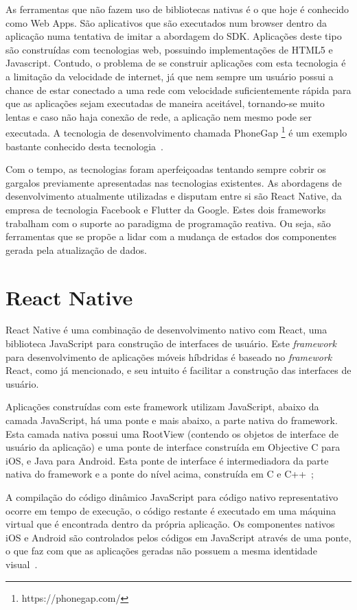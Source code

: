 As ferramentas que não fazem uso de bibliotecas nativas é o que hoje é conhecido como Web Apps.
São aplicativos que são executados num browser dentro da aplicação numa tentativa de imitar a abordagem do SDK. Aplicações deste tipo são construídas com tecnologias web, possuindo implementações de HTML5 e Javascript.
Contudo, o problema de se construir aplicações com esta tecnologia é a limitação da velocidade de internet, já que nem sempre um usuário possui a chance de estar conectado a uma rede com velocidade suficientemente rápida para que as aplicações sejam executadas de maneira aceitável, tornando-se muito lentas e caso não haja conexão de rede, a aplicação nem mesmo pode ser executada.
A tecnologia de desenvolvimento chamada PhoneGap \footnote{https://phonegap.com/} é um exemplo bastante conhecido desta tecnologia~\cite{clow2019flutter}.

Com o tempo, as tecnologias foram aperfeiçoadas tentando sempre cobrir os gargalos previamente apresentadas nas tecnologias existentes.
As abordagens de desenvolvimento atualmente utilizadas e disputam entre si são React Native, da empresa de tecnologia Facebook e Flutter da Google.
Estes dois frameworks trabalham com o suporte ao paradigma de programação reativa.
Ou seja, são ferramentas que se propõe a lidar com a mudança de estados dos componentes gerada pela atualização de dados\cite{lima2019avaliacao}.


\section{React Native}\label{sec:react-native}

React Native é uma combinação de desenvolvimento nativo com React, uma biblioteca JavaScript para construção de interfaces de usuário.
Este \textit{framework} para desenvolvimento de aplicações móveis híbdridas é baseado no \textit{framework} React, como já mencionado, e seu intuito é facilitar a construção das interfaces de usuário.

Aplicações construídas com este framework utilizam JavaScript, abaixo da camada JavaScript, há uma ponte e mais abaixo, a parte nativa do framework.
Esta camada nativa possui uma RootView (contendo os objetos de interface de usuário da aplicação) e uma ponte de interface construída em Objective C para iOS, e Java para Android.
Esta ponte de interface é intermediadora da parte nativa do framework e a ponte do nível acima, construída em C e C++~\cite{yatsenko2019comparative};

A compilação do código dinâmico JavaScript para código nativo representativo ocorre em tempo de execução, o código restante é executado em uma máquina virtual que é encontrada dentro da própria aplicação.
Os componentes nativos iOS e Android são controlados pelos códigos em JavaScript através de uma ponte, o que faz com que as aplicações geradas não possuem a mesma identidade visual~\cite{yatsenko2019comparative}.

